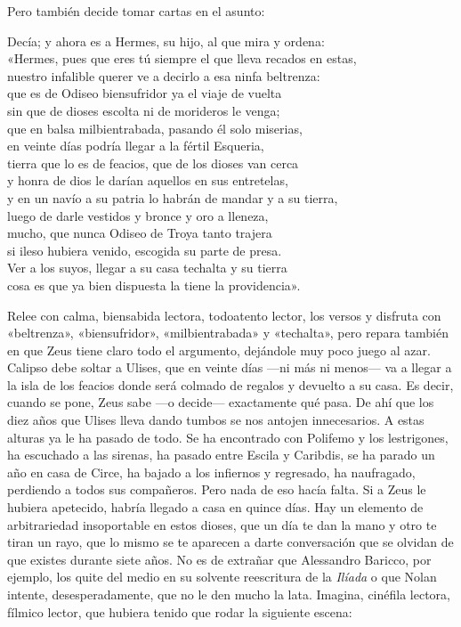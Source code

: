 Pero también decide tomar cartas en el asunto:

\begin{versocita}
Decía; y ahora es a Hermes, su hijo, al que mira y ordena:\\
«Hermes, pues que eres tú siempre el que lleva recados en estas,\\
nuestro infalible querer ve a decirlo a esa ninfa beltrenza:\\
que es de Odiseo biensufridor ya el viaje de vuelta\\
sin que de dioses escolta ni de morideros le venga;\\
que en balsa milbientrabada, pasando él solo miserias,\\
en veinte días podría llegar a la fértil Esqueria,\\
tierra que lo es de feacios, que de los dioses van cerca\\
y honra de dios le darían aquellos en sus entretelas,\\
y en un navío a su patria lo habrán de mandar y a su tierra,\\
luego de darle vestidos y bronce y oro a lleneza,\\
mucho, que nunca Odiseo de Troya tanto trajera\\
si ileso hubiera venido, escogida su parte de presa.\\
Ver a los suyos, llegar a su casa techalta y su tierra\\
cosa es que ya bien dispuesta la tiene la providencia».
\end{versocita}

Relee con calma, biensabida lectora, todoatento lector, los versos y disfruta con «beltrenza», «biensufridor», «milbientrabada» y «techalta», pero repara también en que Zeus tiene claro todo el argumento, dejándole muy poco juego al azar. Calipso debe soltar a Ulises, que en veinte días ---ni más ni menos--- va a llegar a la isla de los feacios donde será colmado de regalos y devuelto a su casa. Es decir, cuando se pone, Zeus sabe ---o decide--- exactamente qué pasa. De ahí que los diez años que Ulises lleva dando tumbos se nos antojen innecesarios. A estas alturas ya le ha pasado de todo. Se ha encontrado con Polifemo y los lestrigones, ha escuchado a las sirenas, ha pasado entre Escila y Caribdis, se ha parado un año en casa de Circe, ha bajado a los infiernos y regresado, ha naufragado, perdiendo a todos sus compañeros. Pero nada de eso hacía falta. Si a Zeus le hubiera apetecido, habría llegado a casa en quince días. Hay un elemento de arbitrariedad insoportable en estos dioses, que un día te dan la mano y otro te tiran un rayo, que lo mismo se te aparecen a darte conversación que se olvidan de que existes durante siete años. No es de extrañar que Alessandro Baricco, por ejemplo, los quite del medio en su solvente reescritura de la \emph{Ilíada} o que Nolan intente, desesperadamente, que no le den mucho la lata. Imagina, cinéfila lectora, fílmico lector, que hubiera tenido que rodar la siguiente escena:

